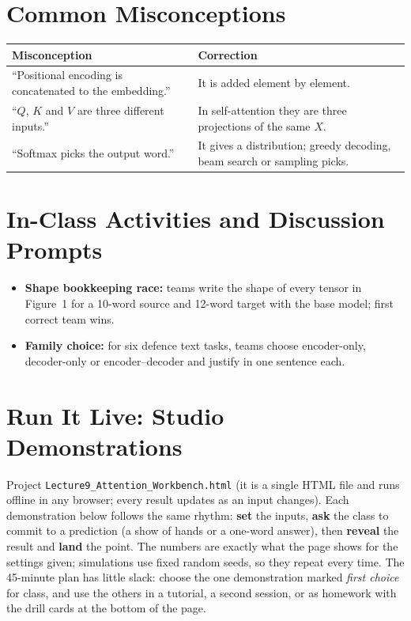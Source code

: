 \documentclass[11pt]{article}
\begin{document}
\section{Common Misconceptions}\begin{center}\small\renewcommand{\arraystretch}{1.35}\begin{tabularx}{\textwidth}{@{}>{\raggedright\arraybackslash}X >{\raggedright\arraybackslash}X@{}}\toprule\textbf{Misconception} & \textbf{Correction}\\\midrule``Positional encoding is concatenated to the embedding.'' & It is added element by element.\\
``$Q$, $K$ and $V$ are three different inputs.'' & In self-attention they are three projections of the same $X$.\\
``Softmax picks the output word.'' & It gives a distribution; greedy decoding, beam search or sampling picks.\\\bottomrule\end{tabularx}\end{center}

\section{In-Class Activities and Discussion Prompts}\label{sec:act}\begin{itemize}\item \textbf{Shape bookkeeping race:} teams write the shape of every tensor in Figure~1 for a 10-word source and 12-word target with the base model; first correct team wins.\item \textbf{Family choice:} for six defence text tasks, teams choose encoder-only, decoder-only or encoder--decoder and justify in one sentence each.\end{itemize}

\section{Run It Live: Studio Demonstrations}\label{sec:live}

Project \texttt{Lecture9\_Attention\_Workbench.html} (it is a single HTML file and runs offline in any browser; every result updates as an input changes). Each demonstration below follows the same rhythm: \textbf{set} the inputs, \textbf{ask} the class to commit to a prediction (a show of hands or a one-word answer), then \textbf{reveal} the result and \textbf{land} the point. The numbers are exactly what the page shows for the settings given; simulations use fixed random seeds, so they repeat every time. The 45-minute plan has little slack: choose the one demonstration marked \emph{first choice} for class, and use the others in a tutorial, a second session, or as homework with the drill cards at the bottom of the page.
\end{document}
